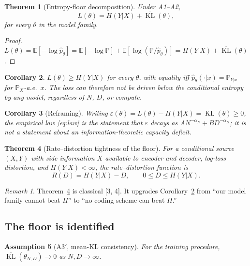 \documentclass[12pt]{article}
\newcommand{\eps}{\varepsilon}
\newcommand{\KL}{\operatorname{KL}}
\newcommand{\E}{\mathbb{E}}
\newcommand{\Prob}{\mathbb{P}}
\newtheorem{theorem}{Theorem}[section]
\newtheorem{corollary}[theorem]{Corollary}
\newtheorem{assumption}[theorem]{Assumption}
\theoremstyle{remark}
\newtheorem{remark}{Remark}
\begin{document}
\begin{theorem}[Entropy-floor decomposition]
\label{thm:decomp}
Under A1--A2,
\begin{equation}
  L(\theta) = H(Y|X) + \overline{\KL}(\theta),
  \label{eq:decomp}
\end{equation}
for every $\theta$ in the model family.
\end{theorem}

\begin{proof}
$L(\theta)=\E[-\log\hat p_\theta]=\E[-\log\Prob]+\E[\log(\Prob/\hat
p_\theta)]=H(Y|X)+\overline{\KL}(\theta)$.
\end{proof}

\begin{corollary}
\label{cor:floor}
$L(\theta)\ge H(Y|X)$ for every $\theta$, with equality iff
$\hat p_\theta(\cdot|x)=\Prob_{Y|x}$ for $\Prob_X$-a.e.\ $x$. The loss can
therefore not be driven below the conditional entropy by any model, regardless
of $N$, $D$, or compute.
\end{corollary}

\begin{corollary}[Reframing]
\label{cor:excess}
Writing $\eps(\theta)=L(\theta)-H(Y|X)=\overline{\KL}(\theta)\ge0$, the
empirical law \eqref{eq:law} is the statement that $\eps$ decays as
$A N^{-\alpha_N}+B D^{-\alpha_D}$; it is \emph{not} a statement about
an information-theoretic capacity deficit.
\end{corollary}

\begin{theorem}[Rate--distortion tightness of the floor]
\label{thm:rd}
For a conditional source $(X,Y)$ with side information $X$ available to encoder
and decoder, log-loss distortion, and $H(Y|X)<\infty$, the rate--distortion
function is
\begin{equation}
  R(D)=H(Y|X)-D,\qquad 0\le D\le H(Y|X).
  \label{eq:rd}
\end{equation}
\end{theorem}
\begin{remark}
Theorem~\ref{thm:rd} is classical [3, 4]. It upgrades
Corollary~\ref{cor:floor} from ``our model family cannot beat $H$'' to
``no coding scheme can beat $H$.''
\end{remark}

\subsection{The floor is identified}
\begin{assumption}[A3$'$, mean-KL consistency]
\label{ass:consistent}
For the training procedure, $\overline{\KL}(\theta_{N,D})\to0$ as
$N,D\to\infty$.
\end{assumption}
\end{document}
